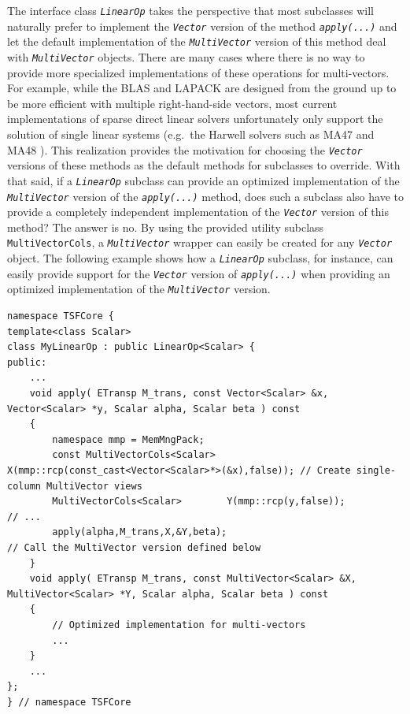 The interface class \texttt{\textit{LinearOp}} takes the perspective
that most subclasses will naturally prefer to implement the
\texttt{\textit{Vector}} version of the method
\texttt{\textit{apply(\-...)}} and let the default implementation of the
\texttt{\textit{Multi\-Vector}} version of this method deal with
\texttt{\textit{Multi\-Vector}} objects.  There are many cases where there is no
way to provide more specialized implementations of these operations
for multi-vectors.  For example, while the BLAS and LAPACK are
designed from the ground up to be more efficient with multiple
right-hand-side vectors, most current implementations of sparse direct
linear solvers unfortunately only support the solution of single
linear systems (e.g.~the Harwell solvers such as MA47 and MA48
\cite{ref:hsl_1995}).  This realization provides the motivation for
choosing the \texttt{\textit{Vector}} versions of these methods as the
default methods for subclasses to override.  With that said, if a
\texttt{\textit{LinearOp}} subclass can
provide an optimized implementation of the \texttt{\textit{Multi\-Vector}}
version of the \texttt{\textit{apply(\-...)}} method, does such a subclass
also have to provide a completely independent implementation of the
\texttt{\textit{Vector}} version of this method?  The answer is no.
By using the provided utility subclass
\texttt{MultiVectorCols}, a \texttt{\textit{Multi\-Vector}} wrapper can
easily be created for any \texttt{\textit{Vector}} object.  The
following example shows how a
\texttt{\textit{LinearOp}} subclass, for instance, can easily provide
support for the \texttt{\textit{Vector}} version of
\texttt{\textit{apply(\-...)}} when providing an optimized
implementation of the \texttt{\textit{Multi\-Vector}} version.

{\tiny\begin{verbatim}
namespace TSFCore {
template<class Scalar>
class MyLinearOp : public LinearOp<Scalar> {
public:
    ...
    void apply( ETransp M_trans, const Vector<Scalar> &x, Vector<Scalar> *y, Scalar alpha, Scalar beta ) const
    {
        namespace mmp = MemMngPack;
        const MultiVectorCols<Scalar>  X(mmp::rcp(const_cast<Vector<Scalar>*>(&x),false)); // Create single-column MultiVector views
        MultiVectorCols<Scalar>        Y(mmp::rcp(y,false));                               // ...
        apply(alpha,M_trans,X,&Y,beta);                                                    // Call the MultiVector version defined below
    }
    void apply( ETransp M_trans, const MultiVector<Scalar> &X, MultiVector<Scalar> *Y, Scalar alpha, Scalar beta ) const
    {
        // Optimized implementation for multi-vectors
        ...
    }
    ...
};
} // namespace TSFCore
\end{verbatim}}

